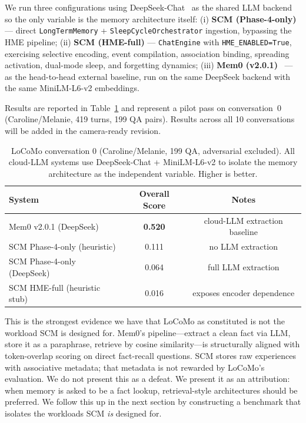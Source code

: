 \documentclass[11pt,twocolumn]{article}
\begin{document}
We run three configurations using DeepSeek-Chat~\cite{deepseek2024} as the shared LLM backend so the only variable is the memory architecture itself:
(i) \textbf{SCM (Phase-4-only)} --- direct \texttt{LongTermMemory} + \texttt{SleepCycleOrchestrator} ingestion, bypassing the HME pipeline;
(ii) \textbf{SCM (HME-full)} --- \texttt{ChatEngine} with \texttt{HME\_ENABLED=True}, exercising selective encoding, event compilation, association binding, spreading activation, dual-mode sleep, and forgetting dynamics;
(iii) \textbf{Mem0 (v2.0.1)}~\cite{mem0} --- as the head-to-head external baseline, run on the same DeepSeek backend with the same MiniLM-L6-v2 embeddings.

Results are reported in Table~\ref{tab:locomo} and represent a pilot pass on conversation~0 (Caroline/Melanie, 419 turns, 199 QA pairs). Results across all 10 conversations will be added in the camera-ready revision.

\begin{table}[t]
\centering
\caption{LoCoMo conversation 0 (Caroline/Melanie, 199 QA, adversarial excluded). All cloud-LLM systems use DeepSeek-Chat + MiniLM-L6-v2 to isolate the memory architecture as the independent variable. Higher is better.}
\label{tab:locomo}
{\footnotesize
\begin{tabular}{@{}lcc@{}}
\toprule
\textbf{System} & \textbf{Overall Score} & \textbf{Notes} \\
\midrule
Mem0 v2.0.1 (DeepSeek)            & \textbf{0.520} & cloud-LLM extraction baseline \\
SCM Phase-4-only (heuristic)      & 0.111          & no LLM extraction \\
SCM Phase-4-only (DeepSeek)       & 0.064          & full LLM extraction \\
SCM HME-full (heuristic stub)     & 0.016          & exposes encoder dependence \\
\bottomrule
\end{tabular}}
\end{table}

This is the strongest evidence we have that LoCoMo as constituted is not the workload SCM is designed for. Mem0's pipeline---extract a clean fact via LLM, store it as a paraphrase, retrieve by cosine similarity---is structurally aligned with token-overlap scoring on direct fact-recall questions. SCM stores raw experiences with associative metadata; that metadata is not rewarded by LoCoMo's evaluation. We do not present this as a defeat. We present it as an attribution: when memory is asked to be a fact lookup, retrieval-style architectures should be preferred. We follow this up in the next section by constructing a benchmark that isolates the workloads SCM \emph{is} designed for.
\end{document}
